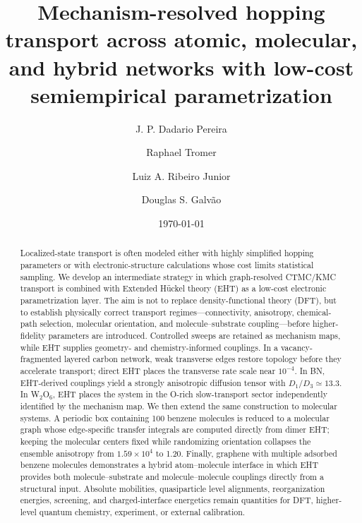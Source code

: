 \documentclass[aps,prmaterials,reprint,amsmath,amssymb,superscriptaddress,longbibliography]{revtex4-2}
\begin{document}
\title{Mechanism-resolved hopping transport across atomic, molecular, and hybrid networks with low-cost semiempirical parametrization}
\author{J. P. Dadario Pereira}
\author{Raphael Tromer}
\author{Luiz A. Ribeiro Junior}
\author{Douglas S. Galv\~ao}
\date{\today}
\begin{abstract}
Localized-state transport is often modeled either with highly simplified hopping parameters or with electronic-structure calculations whose cost limits statistical sampling. We develop an intermediate strategy in which graph-resolved CTMC/KMC transport is combined with Extended H\"uckel theory (EHT) as a low-cost electronic parametrization layer. The aim is not to replace density-functional theory (DFT), but to establish physically correct transport regimes---connectivity, anisotropy, chemical-path selection, molecular orientation, and molecule--substrate coupling---before higher-fidelity parameters are introduced. Controlled sweeps are retained as mechanism maps, while EHT supplies geometry- and chemistry-informed couplings. In a vacancy-fragmented layered carbon network, weak transverse edges restore topology before they accelerate transport; direct EHT places the transverse rate scale near $10^{-4}$. In BN, EHT-derived couplings yield a strongly anisotropic diffusion tensor with $D_1/D_3\simeq13.3$. In W$_2$O$_6$, EHT places the system in the O-rich slow-transport sector independently identified by the mechanism map. We then extend the same construction to molecular systems. A periodic box containing 100 benzene molecules is reduced to a molecular graph whose edge-specific transfer integrals are computed directly from dimer EHT; keeping the molecular centers fixed while randomizing orientation collapses the ensemble anisotropy from $1.59\times10^4$ to 1.20. Finally, graphene with multiple adsorbed benzene molecules demonstrates a hybrid atom--molecule interface in which EHT provides both molecule--substrate and molecule--molecule couplings directly from a structural input. Absolute mobilities, quasiparticle level alignments, reorganization energies, screening, and charged-interface energetics remain quantities for DFT, higher-level quantum chemistry, experiment, or external calibration.
\end{abstract}
\maketitle
\end{document}
